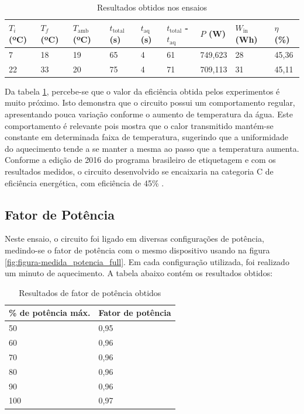 \begin{table}[H]
    \centering
    \caption{Resultados obtidos nos ensaios}
    \begin{tabular}{|l|l|l|l|l|l|l|l|l|} 
	\hline
	$T_i$ (ºC) &$T_f$ (ºC)	&$T_\mathrm{amb}$ (ºC)	 &$t_\mathrm{total}$ (s)	&$t_\mathrm{aq}$ (s)	 &$t_\mathrm{total}$  -  $t_\mathrm{aq}$	&$P$ (W)	&$W_\mathrm{in}$ (Wh)	&$\eta$ (\%)\\\hline	
	7	&18	&19	&65	&4	&61	&749,623	&28	&45,36\\\hline	
	22	&33	&20	&75	&4	&71	&709,113	&31	&45,11\\\hline
    \end{tabular}
    \label{table-eff}
\end{table}


Da tabela \ref{table-eff}, percebe-se que o valor da eficiência obtida pelos experimentos é muito próximo. Isto demonstra que o circuito possui um comportamento regular, apresentando pouca variação conforme o aumento de temperatura da água. Este comportamento é relevante pois mostra que o calor transmitido mantém-se constante em determinada faixa de temperatura, sugerindo que a uniformidade do aquecimento tende a se manter a mesma ao passo que a temperatura aumenta. Conforme a edição de 2016 do programa brasileiro de etiquetagem e com os resultados medidos, o circuito desenvolvido se encaixaria na categoria C de eficiência energética, com eficiência de 45\% \cite{Etiquetagem}.

\subsection{Fator de Potência}

Neste ensaio, o circuito foi ligado em diversas configurações de potência, medindo-se o fator de potência com o mesmo dispositivo usando na figura \ref{fig:figura-medida_potencia_full}. Em cada configuração utilizada, foi realizado um minuto de aquecimento. A tabela abaixo contém os resultados obtidos:

\begin{table}[H]
    \centering
    \caption{Resultados de fator de potência obtidos}
	\begin{tabular}{|l|l|} 
		\hline
		\% de potência máx. &Fator de potência\\\hline
		50 &0,95\\\hline
		60 &0,96\\\hline
		70 &0,96\\\hline
		80 &0,96\\\hline
		90 &0,96\\\hline
		100 &0,97\\\hline
	\end{tabular}
    \label{table-fp}
\end{table}

